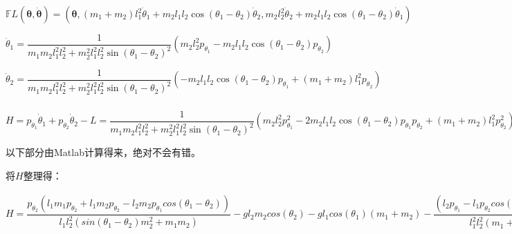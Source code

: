 \documentclass{ctexart}
\begin{document}
$\mathbb{F}L(\bm{\theta}, \bm{ \dot{\theta}})=(\bm{\theta}, (m_1+m_2)l_1^2\dot{\theta}_1+m_2l_1l_2\cos(\theta_1-\theta_2) \dot{\theta}_2, m_2l_2^2\dot{\theta}_2+m_2l_1l_2\cos(\theta_1-\theta_2) \dot{\theta}_1)$

$\dot{\theta}_1= \dfrac{1}{m_1m_2 l_1^2l_2^2+m_2^2 l_1^2l_2^2 \sin(\theta_1-\theta_2)^2}(m_2l_2^2 p_{\theta_1}-m_2l_1l_2 \cos(\theta_1-\theta_2)p_{\theta_2})$

$\dot{\theta}_2=\dfrac{1}{m_1m_2 l_1^2l_2^2+m_2^2 l_1^2l_2^2 \sin(\theta_1-\theta_2)^2}(-m_2l_1l_2 \cos(\theta_1-\theta_2)p_{\theta_1} +(m_1+m_2)l_1^2 p_{\theta_2})$

$H=p_{\theta_1}\dot{\theta}_1+p_{\theta_2}\dot{\theta}_2-L=\dfrac{1}{m_1m_2 l_1^2l_2^2+m_2^2 l_1^2l_2^2 \sin(\theta_1-\theta_2)^2}(m_2l_2^2 p_{\theta_1}^2-2m_2l_1l_2 \cos(\theta_1-\theta_2)p_{\theta_1}p_{\theta_2}+(m_1+m_2)l_1^2 p_{\theta_2}^2)-(m_1+m_2)gl_1 \cos\theta_1-m_2gl_2\cos\theta_2-\frac{1}{2}(m_1+m_2)l_1^2(\dfrac{1}{m_1m_2 l_1^2l_2^2+m_2^2 l_1^2l_2^2 \sin(\theta_1-\theta_2)^2}(m_2l_2^2 p_{\theta_1}-m_2l_1l_2 \cos(\theta_1-\theta_2)p_{\theta_2}))^2-m_2l_1l_2 \cos(\theta_1-\theta_2)(\dfrac{1}{m_1m_2 l_1^2l_2^2+m_2^2 l_1^2l_2^2 \sin(\theta_1-\theta_2)^2}(m_2l_2^2 p_{\theta_1}-m_2l_1l_2 \cos(\theta_1-\theta_2)p_{\theta_2}))\dfrac{1}{m_1m_2 l_1^2l_2^2+m_2^2 l_1^2l_2^2 \sin(\theta_1-\theta_2)^2}(-m_2l_1l_2 \cos(\theta_1-\theta_2)p_{\theta_1} +(m_1+m_2)l_1^2 p_{\theta_2})-\frac{1}{2}l_2^2 (\dfrac{1}{m_1m_2 l_1^2l_2^2+m_2^2 l_1^2l_2^2 \sin(\theta_1-\theta_2)^2}(-m_2l_1l_2 \cos(\theta_1-\theta_2)p_{\theta_1} +(m_1+m_2)l_1^2 p_{\theta_2}))^{2}$

以下部分由Matlab计算得来，绝对不会有错。

将$H$整理得：

$H=\dfrac{ p_{\theta_2} (l_1 m_1  p_{\theta_2} + l_1 m_2  p_{\theta_2} - l_2 m_2  p_{\theta_1} cos( \theta_1 -  \theta_2))}{l_1 l_2^2 (sin( \theta_1 -  \theta_2) m_2^2 + m_1 m_2)}
 - g l_2 m_2 cos( \theta_2)
 - g l_1 cos( \theta_1) (m_1 + m_2) 
- \dfrac{(l_2 p_{\theta_1} - l_1 p_{\theta_2} cos(\theta_1 -  \theta_2))^2 (m_1/2 + m_2/2)}{l_1^2 l_2^2 (m_1 + m_2 sin( \theta_1 -  \theta_2))^2} 
+ \dfrac{ p_{\theta_1} (l_2  p_{\theta_1} - l_1  p_{\theta_2} cos( \theta_1 -  \theta_2))}{l_1^2 l_2 (m_1 + m_2 sin( \theta_1 -  \theta_2))}
 - \dfrac{(l_1 m_1  p_{\theta_2} + l_1 m_2  p_{\theta_2} - l_2 m_2  p_{\theta_1} cos( \theta_1 -  \theta_2)))^2}{2 l_1^2 l_2^2 m_2 (m_1 + m_2 sin( \theta_1 -  \theta_2))^2} 
- (cos( \theta_1 -  \theta_2) \dfrac{l_2  p_{\theta_1} - l_1  p_{\theta_2} cos( \theta_1 -  \theta_2)) (l_1 m_1  p_{\theta_2} + l_1 m_2  p_{\theta_2} - l_2 m_2  p_{\theta_1} cos( \theta_1 -  \theta_2))}{l_1^2 l_2^2 (m_1 + m_2 sin( \theta_1 -  \theta_2))^2}$
\end{document}

